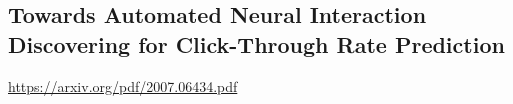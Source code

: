 \begin{bibunit}[plainnat]





\chapter{Towards Automated Neural Interaction Discovering for Click-Through Rate Prediction}
\url{https://arxiv.org/pdf/2007.06434.pdf}



\end{bibunit}
